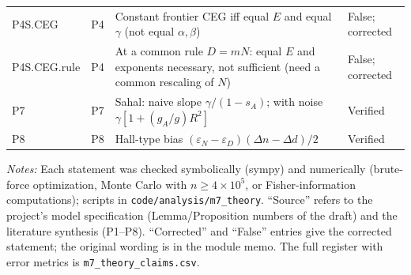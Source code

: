 \begin{table}[htbp]
\begin{threeparttable}
\begin{tabular}{@{}l p{} p{} p{}@{}}
P4S.CEG & \raggedright P4 & \raggedright Constant frontier CEG iff equal $E$ and equal $\gamma$ (not equal $\alpha,\beta$) & \raggedright False; corrected \tabularnewline
P4S.CEG.rule & \raggedright P4 & \raggedright At a common rule $D=mN$: equal $E$ and exponents necessary, not sufficient (need a common rescaling of $N$) & \raggedright False; corrected \tabularnewline
P7 & \raggedright P7 & \raggedright Sahal: naive slope $\gamma/(1-s_A)$; with noise $\gamma[1+(g_A/g)R^2]$ & \raggedright Verified \tabularnewline
P8 & \raggedright P8 & \raggedright Hall-type bias $(\varepsilon_N-\varepsilon_D)(\Delta n-\Delta d)/2$ & \raggedright Verified \tabularnewline
\bottomrule
\end{tabular}
\begin{tablenotes}\footnotesize
\item \textit{Notes:} Each statement was checked symbolically (sympy) and numerically (brute-force optimization, Monte Carlo with $n\geq 4\times10^5$, or Fisher-information computations); scripts in \texttt{code/analysis/m7\_theory}. ``Source'' refers to the project's model specification (Lemma/Proposition numbers of the draft) and the literature synthesis (P1--P8). ``Corrected'' and ``False'' entries give the corrected statement; the original wording is in the module memo. The full register with error metrics is \texttt{m7\_theory\_claims.csv}.
\end{tablenotes}
\end{threeparttable}
\end{table}
